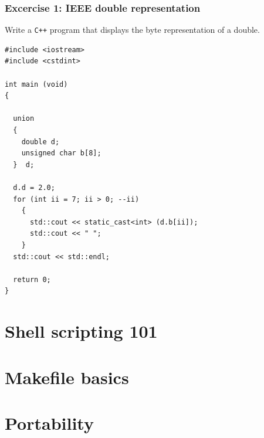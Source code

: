 \documentclass[10pt,c,ignorenonframetext]{beamer}
\begin{document}
\begin{frame}[fragile]
\frametitle{Excercise 1: IEEE double representation}

Write a {\tt C++} program that displays the byte 
representation of a double.

\scriptsize
\begin{lstlisting}
#include <iostream>
#include <cstdint>

int main (void)
{

  union 
  {
    double d;
    unsigned char b[8];
  }  d;

  d.d = 2.0;
  for (int ii = 7; ii > 0; --ii)
    {      
      std::cout << static_cast<int> (d.b[ii]);
      std::cout << " ";
    }
  std::cout << std::endl;

  return 0;
}
\end{lstlisting}
\end{frame}

\section{Shell scripting 101}

\section{Makefile basics}

\section{Portability}
\frame{}
\end{document}

